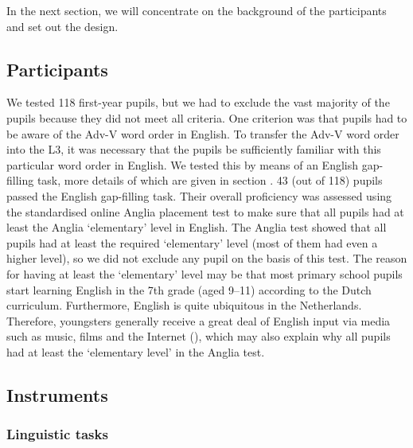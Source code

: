 \documentclass[output=paper,modfonts,nonflat, newtxmath]{langsci/langscibook}
\begin{document}
  In the next section, we will concentrate on the background of the participants and set out the design.

\subsection{{Participants}}
\label{sec:stadt:3.2}

We tested 118 first-year pupils, but we had to exclude the vast majority of the pupils because they did not meet all criteria. One criterion was that pupils had to be aware of the Adv-V word order in English. To transfer the Adv-V word order into the L3, it was necessary that the pupils be sufficiently familiar with this particular word order in English. We tested this by means of an English gap-filling task, more details of which are given in section . 43 (out of 118) pupils passed the English gap-filling task. Their overall proficiency was assessed using the standardised online Anglia placement test to make sure that all pupils had at least the Anglia ‘elementary’ level in English. The Anglia test showed that all pupils had at least the required ‘elementary’ level (most of them had even a higher level), so we did not exclude any pupil on the basis of this test. The reason for having at least the ‘elementary’ level may be that most primary school pupils start learning English in the 7th grade (aged 9–11) according to the Dutch curriculum. Furthermore, English is quite ubiquitous in the Netherlands. Therefore, youngsters generally receive a great deal of English input via media such as music, films and the Internet (\citealt{VerspoorEtAl2007, VerspoorEtAl2010}), which may also explain why all pupils had at least the ‘elementary level’ in the Anglia test.

\subsection{{Instruments} }%
\label{sec:stadt:3.3}
\subsubsection{{Linguistic} {tasks} }%
\label{sec:stadt:3.3.1}
\end{document}
